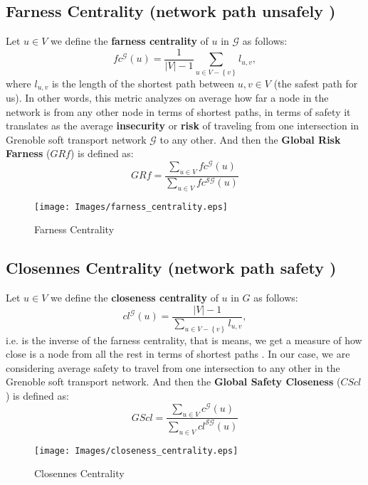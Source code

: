 \documentclass[letterpaper, 10 pt, conference]{ieeeconf}  %
\begin{document}
\subsection{Farness Centrality (network path unsafely )}
Let $u \in V$ we define the \textbf{farness centrality} of $u$ in $\mathcal{G}$ as follows:
\begin{equation}
    fc^{\mathcal{G}}(u) = \frac{1}{|V|-1} \sum_{u \in V- \left \{v \right\}} l_{u,v},
\end{equation}
where $l_{u,v}$ is the length of the shortest path between $u,v \in V$ (the safest path for us). In other words, this metric analyzes on average how far a node in the network is from any other node in terms of shortest paths, in terms of safety it translates as the average \textbf{insecurity} or \textbf{risk} of traveling from one intersection in Grenoble soft transport network $\mathcal{G}$ to any other. And then the \textbf{Global Risk Farness} ($GRf$) is defined as:
\begin{equation}
    GRf = \frac{\sum_{u \in V} fc^{\mathcal{G}}(u)}{\sum_{u \in V} fc^{\mathcal{SG}}(u)}
\end{equation}
\begin{figure}
    \centering
    \texttt{[image: Images/farness\_centrality.eps]}
    \caption{Farness Centrality}
    \label{fc_academic_example}
\end{figure}
\subsection{Closennes Centrality (network path safety )}
Let $u \in V$ we define the \textbf{closeness centrality} of $u$ in $G$ as follows:
\begin{equation}
    cl^{\mathcal{G}}(u) = \frac{|V|-1}{\sum_{u \in V- \left \{v \right\}} l_{u,v}} ,
\end{equation}
i.e. is the inverse of the farness centrality, that is means, we get a measure of how close is a node from all the rest in terms of shortest paths \cite{bloch2016centrality}. In our case, we are considering average safety to travel from one intersection to any other in the Grenoble soft transport network. And then the \textbf{Global Safety Closeness} ($CScl$) is defined as:
\begin{equation}
    GScl = \frac{\sum_{u \in V} c^{\mathcal{G}}(u)}{\sum_{u \in V} cl^{\mathcal{SG}}(u)}
\end{equation}
\begin{figure}
    \centering
    \texttt{[image: Images/closeness\_centrality.eps]}
    \caption{Closennes Centrality}
    \label{clc_academic_example}
\end{figure}
\end{document}
